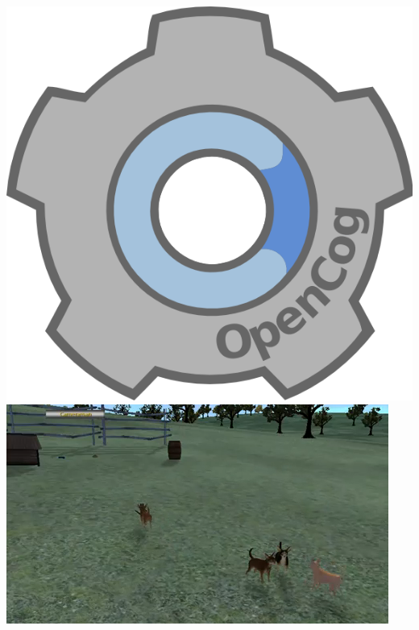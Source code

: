 \documentclass{beamer}
\begin{document}
{ \begin{columns}
    \column{0.5in}
    \includegraphics[scale=0.6]{cog-big.png}
    \column{2in}
    \includegraphics[scale=0.5]{petBrain_multiverse.png}
    \column{0.5in}

\end{columns}}
\end{document}
